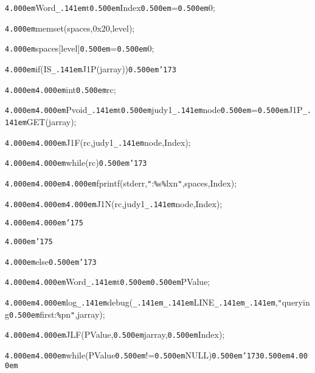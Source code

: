 \noindent
{}{\tt\mc \kern4.000em}Word{\tt\_\kern.141em}t{\tt\mc \kern0.500em}Index{\tt\mc \kern0.500em}={\tt\mc \kern0.500em}0;

\noindent
{}\hfill

\noindent
{}{\tt\mc \kern4.000em}memset(spaces,0x20,level);

\noindent
{}{\tt\mc \kern4.000em}spaces[level]{\tt\mc \kern0.500em}={\tt\mc \kern0.500em}0;

\noindent
{}\hfill

\noindent
{}{\tt\mc \kern4.000em}if(IS{\tt\_\kern.141em}J1P(jarray)){\tt\mc \kern0.500em}{\tt\char'173}

\noindent
{}{\tt\mc \kern4.000em}{\tt\mc \kern4.000em}int{\tt\mc \kern0.500em}rc;

\noindent
{}{\tt\mc \kern4.000em}{\tt\mc \kern4.000em}Pvoid{\tt\_\kern.141em}t{\tt\mc \kern0.500em}judy1{\tt\_\kern.141em}node{\tt\mc \kern0.500em}={\tt\mc \kern0.500em}J1P{\tt\_\kern.141em}GET(jarray);

\noindent
{}{\tt\mc \kern4.000em}{\tt\mc \kern4.000em}J1F(rc,judy1{\tt\_\kern.141em}node,Index);

\noindent
{}{\tt\mc \kern4.000em}{\tt\mc \kern4.000em}while(rc){\tt\mc \kern0.500em}{\tt\char'173}

\noindent
{}{\tt\mc \kern4.000em}{\tt\mc \kern4.000em}{\tt\mc \kern4.000em}fprintf(stderr,{\tt "}:{\tt\%}s{\tt\%}lx{\tt{}}n{\tt "},spaces,Index);

\noindent
{}{\tt\mc \kern4.000em}{\tt\mc \kern4.000em}{\tt\mc \kern4.000em}J1N(rc,judy1{\tt\_\kern.141em}node,Index);

\noindent
{}{\tt\mc \kern4.000em}{\tt\mc \kern4.000em}{\tt\char'175}

\noindent
{}{\tt\mc \kern4.000em}{\tt\char'175}

\noindent
{}{\tt\mc \kern4.000em}else{\tt\mc \kern0.500em}{\tt\char'173}

\noindent
{}{\tt\mc \kern4.000em}{\tt\mc \kern4.000em}Word{\tt\_\kern.141em}t{\tt\mc \kern0.500em}{\tt *}{\tt\mc \kern0.500em}PValue;

\noindent
{}{\tt\mc \kern4.000em}{\tt\mc \kern4.000em}log{\tt\_\kern.141em}debug({\tt\_\kern.141em}{\tt\_\kern.141em}LINE{\tt\_\kern.141em}{\tt\_\kern.141em},{\tt "}querying{\tt\mc \kern0.500em}first:{\tt\%}p{\tt{}}n{\tt "},jarray);

\noindent
{}{\tt\mc \kern4.000em}{\tt\mc \kern4.000em}JLF(PValue,{\tt\mc \kern0.500em}jarray,{\tt\mc \kern0.500em}Index);

\noindent
{}{\tt\mc \kern4.000em}{\tt\mc \kern4.000em}while(PValue{\tt\mc \kern0.500em}!={\tt\mc \kern0.500em}NULL){\tt\mc \kern0.500em}{\tt\char'173}{\tt\mc \kern0.500em}{\tt\mc \kern4.000em}

